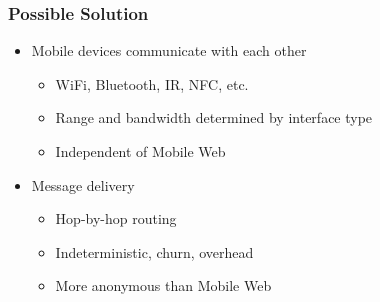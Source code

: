 \begin{frame}
  \frametitle{Possible Solution}  
  \begin{itemize}
    \item Mobile devices communicate with each other
    \vspace{0.3cm}
    \begin{itemize}
      \item WiFi, Bluetooth, IR, NFC, etc.
      \vspace{0.1cm}
      \item Range and bandwidth determined by interface type
      \vspace{0.1cm}
      \item Independent of Mobile Web
    \end{itemize}    

    \vspace{0.3cm}

    \item Message delivery
    \vspace{0.3cm}
    \begin{itemize}
      \item Hop-by-hop routing
      \vspace{0.1cm}
      \item Indeterministic, churn, overhead
      \vspace{0.1cm}
      \item More anonymous than Mobile Web
    \end{itemize} 
  \end{itemize}



\end{frame}


